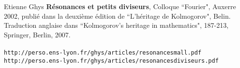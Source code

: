 \documentclass[12pt]{article}
\begin{document}
\begin{thebibliography}{}
\begin{thebibliography}{}

\item Etienne Ghys \textbf{R\'{e}sonances et petits diviseurs}, Colloque ``Fourier", Auxerre 2002, publi\'{e} dans la deuxi\`{e}me \'{e}dition de ``L'h\'{e}ritage de Kolmogorov", Belin. Traduction anglaise dans ``Kolmogorov's heritage in mathematics", 187-213, Springer, Berlin, 2007.  \\ \\
\texttt{http://perso.ens-lyon.fr/ghys/articles/resonancesmall.pdf}
\texttt{http://perso.ens-lyon.fr/ghys/articles/resonancesdiviseurs.pdf}


\end{thebibliography}

\end{thebibliography}
\end{document}
